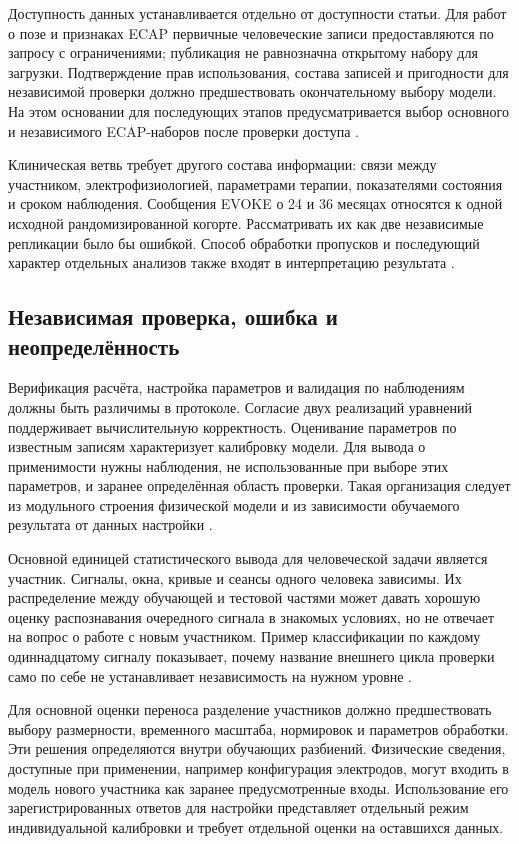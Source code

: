 Доступность данных устанавливается отдельно от доступности статьи. Для работ о позе и признаках ECAP первичные человеческие записи предоставляются по запросу с ограничениями; публикация не равнозначна открытому набору для загрузки. Подтверждение прав использования, состава записей и пригодности для независимой проверки должно предшествовать окончательному выбору модели. На этом основании для последующих этапов предусматривается выбор основного и независимого ECAP-наборов после проверки доступа \cite{posture,s105}.

Клиническая ветвь требует другого состава информации: связи между участником, электрофизиологией, параметрами терапии, показателями состояния и сроком наблюдения. Сообщения EVOKE о 24 и 36 месяцах относятся к одной исходной рандомизированной когорте. Рассматривать их как две независимые репликации было бы ошибкой. Способ обработки пропусков и последующий характер отдельных анализов также входят в интерпретацию результата \cite{s780,s781}.

\subsection{Независимая проверка, ошибка и неопределённость}

Верификация расчёта, настройка параметров и валидация по наблюдениям должны быть различимы в протоколе. Согласие двух реализаций уравнений поддерживает вычислительную корректность. Оценивание параметров по известным записям характеризует калибровку модели. Для вывода о применимости нужны наблюдения, не использованные при выборе этих параметров, и заранее определённая область проверки. Такая организация следует из модульного строения физической модели и из зависимости обучаемого результата от данных настройки \cite{s285,ecapmodel}.

Основной единицей статистического вывода для человеческой задачи является участник. Сигналы, окна, кривые и сеансы одного человека зависимы. Их распределение между обучающей и тестовой частями может давать хорошую оценку распознавания очередного сигнала в знакомых условиях, но не отвечает на вопрос о работе с новым участником. Пример классификации по каждому одиннадцатому сигналу показывает, почему название внешнего цикла проверки само по себе не устанавливает независимость на нужном уровне \cite{s105}.

Для основной оценки переноса разделение участников должно предшествовать выбору размерности, временного масштаба, нормировок и параметров обработки. Эти решения определяются внутри обучающих разбиений. Физические сведения, доступные при применении, например конфигурация электродов, могут входить в модель нового участника как заранее предусмотренные входы. Использование его зарегистрированных ответов для настройки представляет отдельный режим индивидуальной калибровки и требует отдельной оценки на оставшихся данных.


